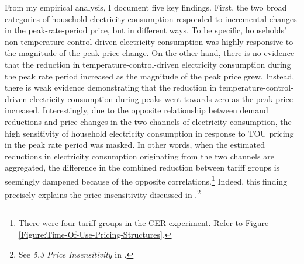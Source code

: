 From my empirical analysis, I document five key findings. First, the two broad categories of household electricity consumption responded to incremental changes in the peak-rate-period price, but in different ways. To be specific, households' non-temperature-control-driven electricity consumption was highly responsive to the magnitude of the peak price change. On the other hand, there is no evidence that the reduction in temperature-control-driven electricity consumption during the peak rate period increased as the magnitude of the peak price grew. Instead, there is weak evidence demonstrating that the reduction in temperature-control-driven electricity consumption during peaks went towards zero as the peak price increased. Interestingly, due to the opposite relationship between demand reductions and price changes in the two channels of electricity consumption, the high sensitivity of household electricity consumption in response to TOU pricing in the peak rate period was masked. In other words, when the estimated reductions in electricity consumption originating from the two channels are aggregated, the difference in the combined reduction between tariff groups is seemingly dampened because of the opposite correlations.\footnote{There were four tariff groups in the CER experiment. Refer to Figure \ref{Figure:Time-Of-Use-Pricing-Structures}.} Indeed, this finding precisely explains the price insensitivity discussed in \cite{Peaking-Interest:How-Awareness-Drives-the-Effectiveness-of-Time-of-Use-Electricity-Pricing_Prest_2020}.\footnote{See \textit{5.3 Price Insensitivity} in \cite{Peaking-Interest:How-Awareness-Drives-the-Effectiveness-of-Time-of-Use-Electricity-Pricing_Prest_2020}.}  

